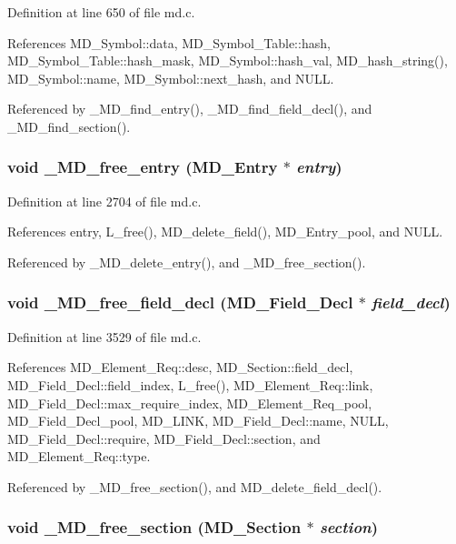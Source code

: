 Definition at line 650 of file md.c.

References MD\_\-Symbol::data, MD\_\-Symbol\_\-Table::hash, MD\_\-Symbol\_\-Table::hash\_\-mask, MD\_\-Symbol::hash\_\-val, MD\_\-hash\_\-string(), MD\_\-Symbol::name, MD\_\-Symbol::next\_\-hash, and NULL.

Referenced by \_\-MD\_\-find\_\-entry(), \_\-MD\_\-find\_\-field\_\-decl(), and \_\-MD\_\-find\_\-section().
\subsubsection{\setlength{\rightskip}{0pt plus 5cm}void \_\-MD\_\-free\_\-entry (\bf{MD\_\-Entry} $\ast$ {\em entry})}\label{md_8c_95e36d143db61b0f52862cad546ac8c1}




Definition at line 2704 of file md.c.

References entry, L\_\-free(), MD\_\-delete\_\-field(), MD\_\-Entry\_\-pool, and NULL.

Referenced by \_\-MD\_\-delete\_\-entry(), and \_\-MD\_\-free\_\-section().
\subsubsection{\setlength{\rightskip}{0pt plus 5cm}void \_\-MD\_\-free\_\-field\_\-decl (\bf{MD\_\-Field\_\-Decl} $\ast$ {\em field\_\-decl})}\label{md_8c_a84268ad28784171bc614463e1ca7061}




Definition at line 3529 of file md.c.

References MD\_\-Element\_\-Req::desc, MD\_\-Section::field\_\-decl, MD\_\-Field\_\-Decl::field\_\-index, L\_\-free(), MD\_\-Element\_\-Req::link, MD\_\-Field\_\-Decl::max\_\-require\_\-index, MD\_\-Element\_\-Req\_\-pool, MD\_\-Field\_\-Decl\_\-pool, MD\_\-LINK, MD\_\-Field\_\-Decl::name, NULL, MD\_\-Field\_\-Decl::require, MD\_\-Field\_\-Decl::section, and MD\_\-Element\_\-Req::type.

Referenced by \_\-MD\_\-free\_\-section(), and MD\_\-delete\_\-field\_\-decl().
\subsubsection{\setlength{\rightskip}{0pt plus 5cm}void \_\-MD\_\-free\_\-section (\bf{MD\_\-Section} $\ast$ {\em section})}\label{md_8c_520a6f281d2970d87bc14e775ff06dfc}




